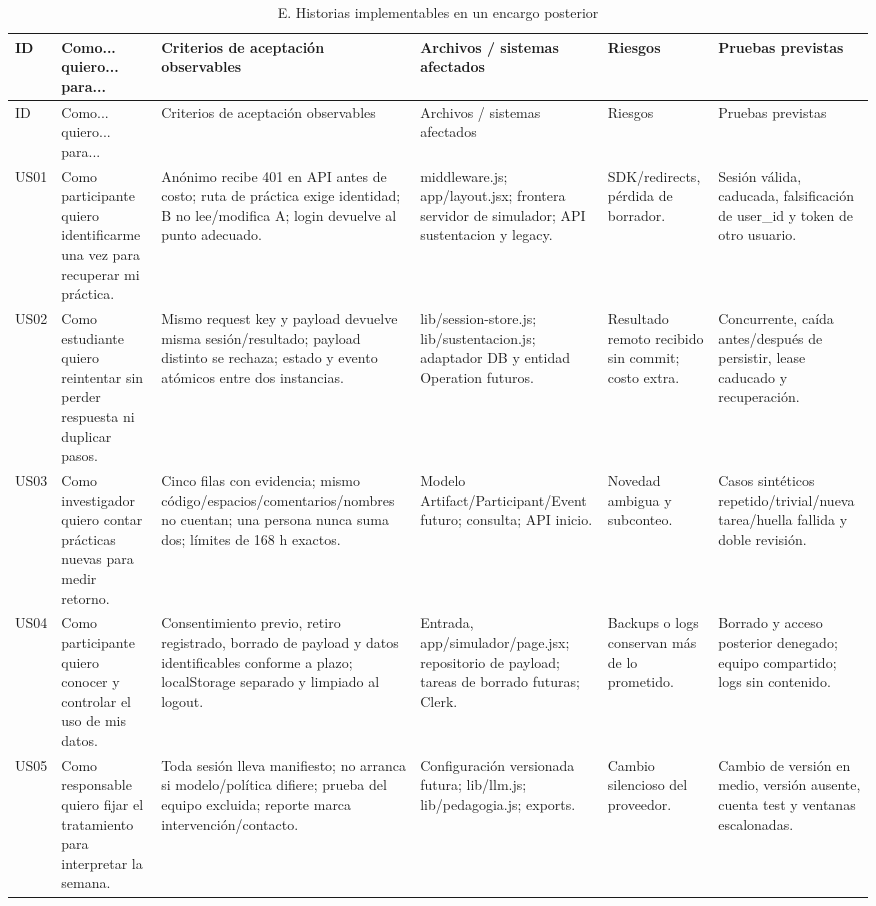 \documentclass[11pt,a4paper]{report}
\begin{document}
\begin{landscape}
\small
\begin{longtable}{P{0.9cm}P{4.6cm}P{6.2cm}P{4.4cm}P{3.2cm}P{3.8cm}}
\caption{E. Historias implementables en un encargo posterior}\label{tab:historias}\\
\toprule ID & Como... quiero... para... & Criterios de aceptación observables & Archivos / sistemas afectados & Riesgos & Pruebas previstas \\\midrule\endfirsthead
\toprule ID & Como... quiero... para... & Criterios de aceptación observables & Archivos / sistemas afectados & Riesgos & Pruebas previstas \\\midrule\endhead
US01 & Como participante quiero identificarme una vez para recuperar mi práctica. & Anónimo recibe 401 en API antes de costo; ruta de práctica exige identidad; B no lee/modifica A; login devuelve al punto adecuado. & middleware.js; app/layout.jsx; frontera servidor de simulador; API sustentacion y legacy. & SDK/redirects, pérdida de borrador. & Sesión válida, caducada, falsificación de user\_id y token de otro usuario.\\
US02 & Como estudiante quiero reintentar sin perder respuesta ni duplicar pasos. & Mismo request key y payload devuelve misma sesión/resultado; payload distinto se rechaza; estado y evento atómicos entre dos instancias. & lib/session-store.js; lib/sustentacion.js; adaptador DB y entidad Operation futuros. & Resultado remoto recibido sin commit; costo extra. & Concurrente, caída antes/después de persistir, lease caducado y recuperación.\\
US03 & Como investigador quiero contar prácticas nuevas para medir retorno. & Cinco filas con evidencia; mismo código/espacios/comentarios/nombres no cuentan; una persona nunca suma dos; límites de 168 h exactos. & Modelo Artifact/Participant/Event futuro; consulta; API inicio. & Novedad ambigua y subconteo. & Casos sintéticos repetido/trivial/nueva tarea/huella fallida y doble revisión.\\
US04 & Como participante quiero conocer y controlar el uso de mis datos. & Consentimiento previo, retiro registrado, borrado de payload y datos identificables conforme a plazo; localStorage separado y limpiado al logout. & Entrada, app/simulador/page.jsx; repositorio de payload; tareas de borrado futuras; Clerk. & Backups o logs conservan más de lo prometido. & Borrado y acceso posterior denegado; equipo compartido; logs sin contenido.\\
US05 & Como responsable quiero fijar el tratamiento para interpretar la semana. & Toda sesión lleva manifiesto; no arranca si modelo/política difiere; prueba del equipo excluida; reporte marca intervención/contacto. & Configuración versionada futura; lib/llm.js; lib/pedagogia.js; exports. & Cambio silencioso del proveedor. & Cambio de versión en medio, versión ausente, cuenta test y ventanas escalonadas.\\

\end{longtable}
\end{landscape}
\end{document}
